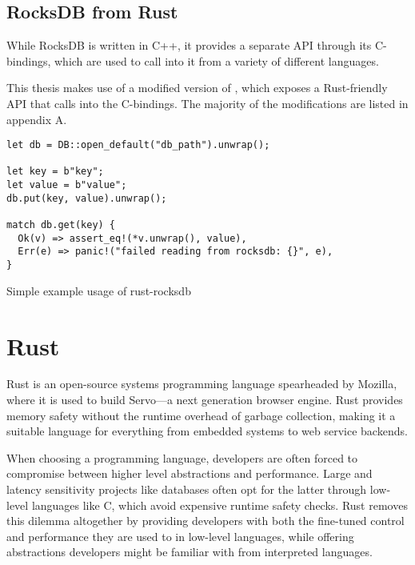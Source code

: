 \subsection{RocksDB from Rust}\label{sec:rust-rocksdb}
While RocksDB is written in C++, it provides a separate API through its
C-bindings, which are used to call into it from a variety of different
languages.

This thesis makes use of a modified version of
, which
exposes a Rust-friendly API that calls into the C-bindings. The
majority of the modifications are listed in appendix A.

\begin{listing}[H]
  \begin{verbatim}
let db = DB::open_default("db_path").unwrap();

let key = b"key";
let value = b"value";
db.put(key, value).unwrap();

match db.get(key) {
  Ok(v) => assert_eq!(*v.unwrap(), value),
  Err(e) => panic!("failed reading from rocksdb: {}", e),
}
  \end{verbatim}

  \caption{Simple example usage of rust-rocksdb}\label{lst:rocksdb-rust}
\end{listing}

\section{Rust}\label{sec:rust}

Rust is an open-source systems programming
language spearheaded by Mozilla, where it is used to build Servo---a next
generation browser engine. Rust provides memory safety
without the runtime overhead of \eg garbage collection, making it a suitable
language for everything from embedded systems to web service backends.

When choosing a programming language, developers are often forced to compromise
between higher level abstractions and performance. Large and latency sensitivity
projects like databases often opt for the latter through low-level languages
like C, which avoid expensive runtime safety checks. Rust removes this dilemma
altogether by providing developers with both the fine-tuned control and
performance they are used to in low-level languages, while offering abstractions
developers might be familiar with from interpreted languages.


